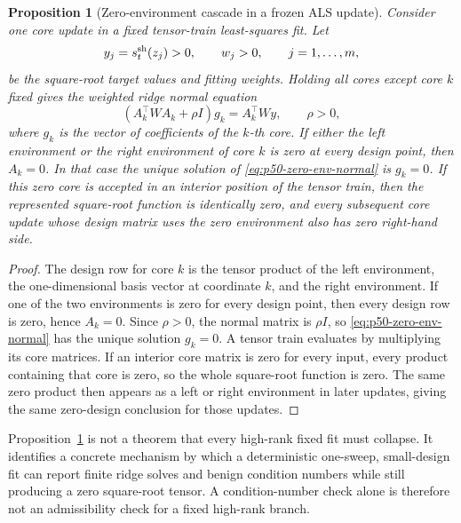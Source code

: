 \documentclass[11pt]{article}
\newtheorem{proposition}{Proposition}
\numberwithin{equation}{section}
\begin{document}
\begin{proposition}[Zero-environment cascade in a frozen ALS update]
\label{prop:p50-zero-environment-cascade}
Consider one core update in a fixed tensor-train least-squares fit.  Let
\[
    y_j=s_t^{\rm sh}(z_j)>0,\qquad
    w_j>0,\qquad j=1,\ldots,m,
\]
be the square-root target values and fitting weights.  Holding all cores except
core \(k\) fixed gives the weighted ridge normal equation
\begin{equation}
    (A_k^\top W A_k+\rho I)g_k=A_k^\top W y,
    \qquad \rho>0,
    \label{eq:p50-zero-env-normal}
\end{equation}
where \(g_k\) is the vector of coefficients of the \(k\)-th core.  If either
the left environment or the right environment of core \(k\) is zero at every
design point, then \(A_k=0\).  In that case the unique solution of
\eqref{eq:p50-zero-env-normal} is \(g_k=0\).  If this zero core is accepted in
an interior position of the tensor train, then the represented square-root
function is identically zero, and every subsequent core update whose design
matrix uses the zero environment also has zero right-hand side.
\end{proposition}

\begin{proof}
The design row for core \(k\) is the tensor product of the left environment,
the one-dimensional basis vector at coordinate \(k\), and the right
environment.  If one of the two environments is zero for every design point,
then every design row is zero, hence \(A_k=0\).  Since \(\rho>0\), the normal
matrix is \(\rho I\), so \eqref{eq:p50-zero-env-normal} has the unique solution
\(g_k=0\).  A tensor train evaluates by multiplying its core matrices.  If an
interior core matrix is zero for every input, every product containing that
core is zero, so the whole square-root function is zero.  The same zero product
then appears as a left or right environment in later updates, giving the same
zero-design conclusion for those updates.
\end{proof}

Proposition~\ref{prop:p50-zero-environment-cascade} is not a theorem that every
high-rank fixed fit must collapse.  It identifies a concrete mechanism by which
a deterministic one-sweep, small-design fit can report finite ridge solves and
benign condition numbers while still producing a zero square-root tensor.  A
condition-number check alone is therefore not an admissibility check for a
fixed high-rank branch.
\end{document}
